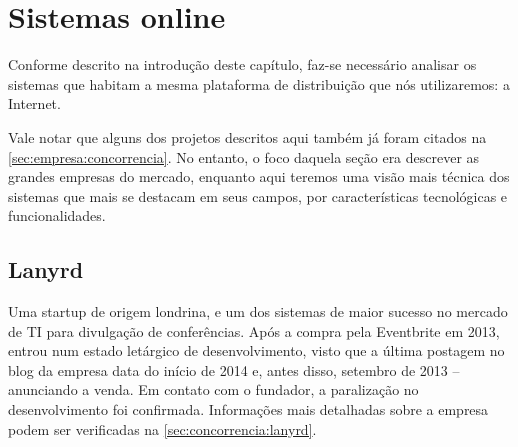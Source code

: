 \documentclass[12pt,a4paper,twoside,hyphens,english,brazil]{abntex2}
\begin{document}
\section{Sistemas online} \label{sec:sistemas:online}
Conforme descrito na introdução deste capítulo, faz-se necessário analisar os sistemas que habitam a mesma plataforma de distribuição que nós utilizaremos: a Internet.

Vale notar que alguns dos projetos descritos aqui também já foram citados na \autoref{sec:empresa:concorrencia}. No entanto, o foco daquela seção era descrever as grandes empresas do mercado, enquanto aqui teremos uma visão mais técnica dos sistemas que mais se destacam em seus campos, por características tecnológicas e funcionalidades.

\subsection{Lanyrd} \label{sec:concorrencia:lanyrd:tec}
Uma startup de origem londrina, e um dos sistemas de maior sucesso no mercado de TI para divulgação de conferências. Após a compra pela Eventbrite em 2013, entrou num estado letárgico de desenvolvimento, visto que a última postagem no blog da empresa data do início de 2014 e, antes disso, setembro de 2013 -- anunciando a venda. Em contato com o fundador, a paralização no desenvolvimento foi confirmada.\cite{lanyrd-abandonado} Informações mais detalhadas sobre a empresa podem ser verificadas na \autoref{sec:concorrencia:lanyrd}.
\end{document}
